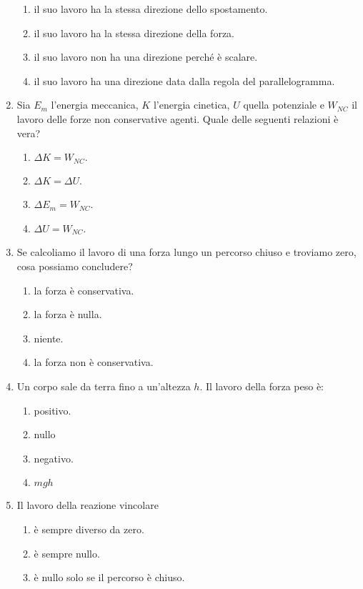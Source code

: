 \documentclass{article}
\begin{document}
\begin{enumerate}
  \begin{enumerate}[label=\Alph*.]
    \item il suo lavoro ha la stessa direzione dello spostamento.
    \item il suo lavoro ha la stessa direzione della forza.
    \item il suo lavoro non ha una direzione perché è scalare.
    \item il suo lavoro ha una direzione data dalla regola del parallelogramma.
  \end{enumerate}
  \item Sia $E_m$ l'energia meccanica, $K$ l'energia cinetica, $U$ quella potenziale e $W_{NC}$ il lavoro delle forze non conservative agenti. Quale delle seguenti relazioni è vera?
  \begin{enumerate}[label=\Alph*.]
    \item $\Delta K=W_{NC}.$
    \item $\Delta K = \Delta U$.
    \item $\Delta E_m=W_{NC}$.
    \item $\Delta U=W_{NC}$.
  \end{enumerate}
  \item Se calcoliamo il lavoro di una forza lungo un percorso chiuso e troviamo zero, cosa possiamo concludere?
  \begin{enumerate}[label=\Alph*.]
    \item la forza è conservativa.
    \item la forza è nulla.
    \item niente.
    \item la forza non è conservativa.
  \end{enumerate}
  \item Un corpo sale da terra fino a un'altezza $h$. Il lavoro della forza peso è:
  \begin{enumerate}[label=\Alph*.]
    \item positivo.
    \item nullo
    \item negativo.
    \item $mgh$
  \end{enumerate}
  \item Il lavoro della reazione vincolare
  \begin{enumerate}[label=\Alph*.]
    \item è sempre diverso da zero.
    \item è sempre nullo.
    \item è nullo solo se il percorso è chiuso.

\end{enumerate}
\end{enumerate}
\end{document}
